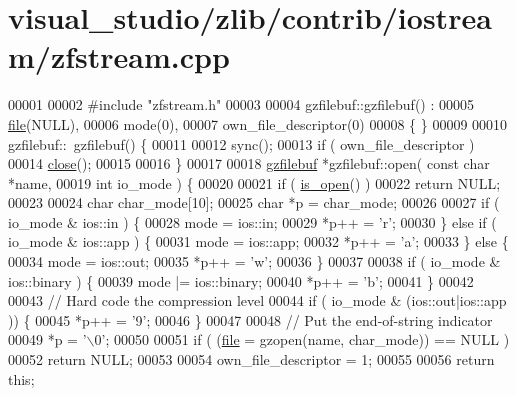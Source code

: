 \hypertarget{visual__studio_2zlib_2contrib_2iostream_2zfstream_8cpp_source}{}\section{visual\+\_\+studio/zlib/contrib/iostream/zfstream.cpp}
\label{visual__studio_2zlib_2contrib_2iostream_2zfstream_8cpp_source}

\begin{DoxyCode}
00001 
00002 \textcolor{preprocessor}{#include "zfstream.h"}
00003 
00004 gzfilebuf::gzfilebuf() :
00005   \hyperlink{structfile}{file}(NULL),
00006   mode(0),
00007   own\_file\_descriptor(0)
00008 \{ \}
00009 
00010 gzfilebuf::~gzfilebuf() \{
00011 
00012   sync();
00013   \textcolor{keywordflow}{if} ( own\_file\_descriptor )
00014     \hyperlink{classgzofstream_a59e8b01e1c9741085f18ca456c4b8f54}{close}();
00015 
00016 \}
00017 
00018 \hyperlink{classgzfilebuf}{gzfilebuf} *gzfilebuf::open( \textcolor{keyword}{const} \textcolor{keywordtype}{char} *name,
00019                             \textcolor{keywordtype}{int} io\_mode ) \{
00020 
00021   \textcolor{keywordflow}{if} ( \hyperlink{classgzofstream_acb1c9c6dccaf41bc5e44c2263ea48de3}{is\_open}() )
00022     \textcolor{keywordflow}{return} NULL;
00023 
00024   \textcolor{keywordtype}{char} char\_mode[10];
00025   \textcolor{keywordtype}{char} *p = char\_mode;
00026 
00027   \textcolor{keywordflow}{if} ( io\_mode & ios::in ) \{
00028     mode = ios::in;
00029     *p++ = \textcolor{charliteral}{'r'};
00030   \} \textcolor{keywordflow}{else} \textcolor{keywordflow}{if} ( io\_mode & ios::app ) \{
00031     mode = ios::app;
00032     *p++ = \textcolor{charliteral}{'a'};
00033   \} \textcolor{keywordflow}{else} \{
00034     mode = ios::out;
00035     *p++ = \textcolor{charliteral}{'w'};
00036   \}
00037 
00038   \textcolor{keywordflow}{if} ( io\_mode & ios::binary ) \{
00039     mode |= ios::binary;
00040     *p++ = \textcolor{charliteral}{'b'};
00041   \}
00042 
00043   \textcolor{comment}{// Hard code the compression level}
00044   \textcolor{keywordflow}{if} ( io\_mode & (ios::out|ios::app )) \{
00045     *p++ = \textcolor{charliteral}{'9'};
00046   \}
00047 
00048   \textcolor{comment}{// Put the end-of-string indicator}
00049   *p = \textcolor{charliteral}{'\(\backslash\)0'};
00050 
00051   \textcolor{keywordflow}{if} ( (\hyperlink{structfile}{file} = gzopen(name, char\_mode)) == NULL )
00052     \textcolor{keywordflow}{return} NULL;
00053 
00054   own\_file\_descriptor = 1;
00055 
00056   \textcolor{keywordflow}{return} \textcolor{keyword}{this};

\end{DoxyCode}
